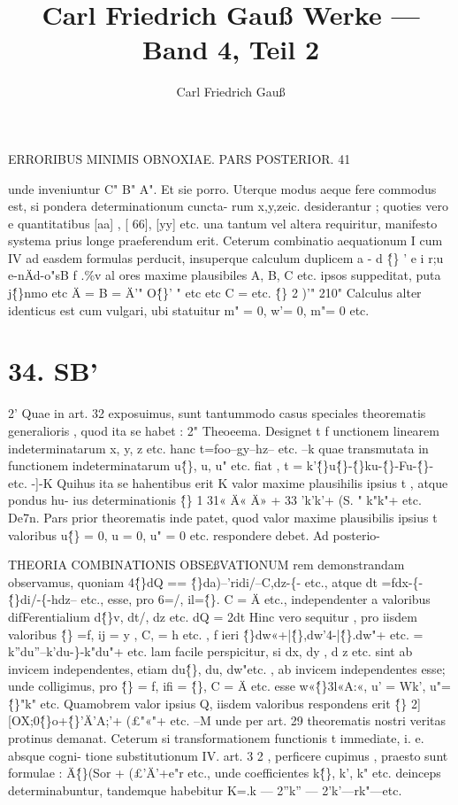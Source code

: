 \documentclass[12pt,a4paper]{article}
\title{Carl Friedrich Gau{\ss} Werke --- Band 4, Teil 2}
\author{Carl Friedrich Gau{\ss}}
\date{}
\begin{document}
\maketitle
\thispagestyle{empty}

\setcounter{page}{51}
\begin{center}
\textsc{ERRORIBUS MINIMIS OBNOXIAE. PARS POSTERIOR. 41}
\end{center}
unde inveniuntur C" B" A". Et sie porro.
Uterque modus aeque fere commodus est, si pondera determinationum cuncta-
rum x,y,zeic. desiderantur ; quoties vero e quantitatibus [aa] , [ 66], [yy] etc.
una tantum vel altera requiritur, manifesto systema prius longe praeferendum erit.
Ceterum combinatio aequationum I cum IV ad easdem formulas perducit,
insuperque calculum duplicem a - d \^\{\} ' e i r;u e-nÄd-o"sB
f
.\%v al ores maxime plausibiles A, B, C
etc. ipsos suppeditat, puta j\^\{\}nmo
etc
Ä =
B = Ä'" O\^\{\}' " etc
etc
C =
etc. \^\{\} 2 )'"
210"
Calculus alter identicus est cum vulgari, ubi statuitur m" = 0, w'= 0, m"= 0 etc.
\section*{\textbf{34.} SB'}
2'
Quae in art. 32 exposuimus, sunt tantummodo casus speciales theorematis
generalioris , quod ita se habet :
2"
Theoeema. Designet t f unctionem linearem indeterminatarum x, y, z etc. hanc
t=foo--gy--hz-- etc. --k
quae transmutata in functionem indeterminatarum u\^\{\}, u, u" etc. fiat ,
t = k'\^\{\}u\^\{\}-\^\{\}ku-\^\{\}-Fu-\^\{\}- etc. -]-K
Quihus ita se hahentibus erit K valor maxime plausihilis ipsius t , atque pondus hu-
ius determinationis \^\{\}
1
31« Ä« Ä» + 33 'k'k'+ (S. " k"k"+ etc.
De7n. Pars prior theorematis inde patet, quod valor maxime plausibilis
ipsius t valoribus u\^\{\} = 0, u = 0, u" = 0 etc. respondere debet. Ad posterio-

 THEORIA COMBINATIONIS OBSEßVATIONUM
rem demonstrandam observamus, quoniam 4\^\{\}dQ == \^\{\}da)--'ridi/--C,dz-\{- etc.,
atque dt =fdx-\{-\^\{\}di/-\{-hdz-- etc., esse, pro 6=/, il=\^\{\}. C = Ä etc.,
independenter a valoribus difFerentialium d\^\{\}v, dt/, dz etc.
dQ = 2dt
Hinc vero sequitur , pro iisdem valoribus \^\{\} =f, ij = y , C, = h etc. , f ieri
\^\{\}dw«+|\^\{\},dw'4-|\^\{\}.dw"+ etc. = k''du''--k'du-\}-k"du"+ etc.
lam facile perspicitur, si dx, dy , d z etc. sint ab invicem independentes,
etiam du\^\{\}, du, dw"etc. , ab invicem independentes esse; unde colligimus, pro
\^\{\} = f, ifi = \^\{\}, C = Ä etc. esse
w«\^\{\}3l«A:«, u' = Wk', u"=\^\{\}"k" etc.
Quamobrem valor ipsius Q, iisdem valoribus respondens erit
\^\{\} 2][OX;0\^\{\}o+\^\{\}'Ä'A;'+ (£"«"+ etc. --M
unde per art. 29 theorematis nostri veritas protinus demanat.
Ceterum si transformationem functionis t immediate, i. e. absque cogni-
tione substitutionum IV. art. 3 2 , perficere cupimus , praesto sunt formulae :
Ä\^\{\}(Sor + (£'Ä'+e"r etc.,
unde coefficientes k\^\{\}, k', k" etc. deinceps determinabuntur, tandemque habebitur
K=.k --- 2''k'' --- 2'k'---rk"---etc.
\end{document}
